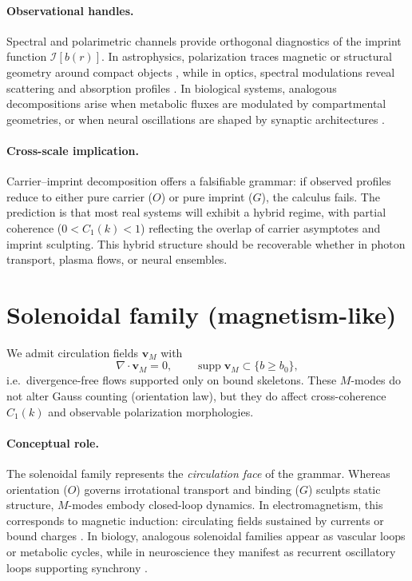 \documentclass[12pt,a4paper,oneside]{scrreprt}
\begin{document}
\paragraph{Observational handles.} 
Spectral and polarimetric channels provide orthogonal diagnostics of the 
imprint function $\mathcal I[b(r)]$. 
In astrophysics, polarization traces magnetic or structural geometry around 
compact objects \citep{EventHorizonTelescope2022Science}, 
while in optics, spectral modulations reveal scattering and absorption profiles 
\citep{Mandel1995Optical}. 
In biological systems, analogous decompositions arise when metabolic fluxes 
are modulated by compartmental geometries, or when neural oscillations 
are shaped by synaptic architectures \citep{Buzsaki2006Rhythms}. 

\paragraph{Cross-scale implication.} 
Carrier–imprint decomposition offers a falsifiable grammar: 
if observed profiles reduce to either pure carrier ($O$) or pure imprint ($G$), 
the calculus fails. 
The prediction is that most real systems will exhibit a hybrid regime, 
with partial coherence ($0 < C_1(k) < 1$) reflecting the overlap of 
carrier asymptotes and imprint sculpting. 
This hybrid structure should be recoverable whether in photon transport, 
plasma flows, or neural ensembles.

\section{Solenoidal family (magnetism-like)}\label{sec:solenoids}

We admit circulation fields $\mathbf v_M$ with
\[
\nabla \!\cdot \mathbf v_M = 0,
\qquad 
\operatorname{supp}\mathbf v_M \subset \{ b \ge b_0 \},
\]
i.e.\ divergence-free flows supported only on bound skeletons. 
These $M$-modes do not alter Gauss counting (orientation law), 
but they do affect cross-coherence $C_1(k)$ and observable polarization morphologies. 

\paragraph{Conceptual role.} 
The solenoidal family represents the \emph{circulation face} of the grammar. 
Whereas orientation ($O$) governs irrotational transport and binding ($G$) 
sculpts static structure, $M$-modes embody closed-loop dynamics. 
In electromagnetism, this corresponds to magnetic induction: 
circulating fields sustained by currents or bound charges \citep{Jackson1999Classical}. 
In biology, analogous solenoidal families appear as vascular loops or 
metabolic cycles, while in neuroscience they manifest as recurrent oscillatory 
loops supporting synchrony \citep{Buzsaki2006Rhythms}. 
\end{document}
